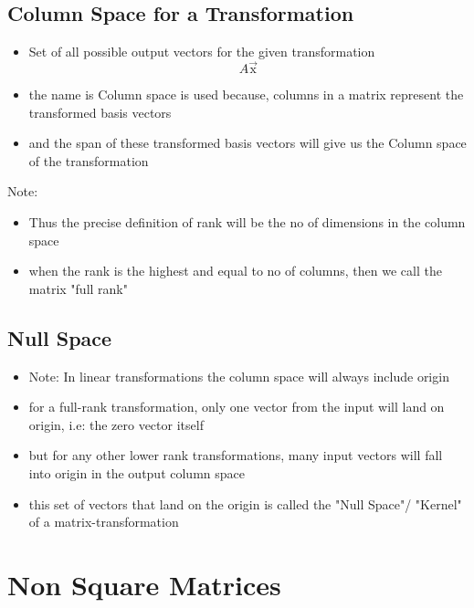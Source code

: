 \documentclass[a4paper]{article}
\begin{document}
\subsection{Column Space for a Transformation}
\begin{itemize}
	\item Set of all possible output vectors for the given transformation
	      \[
		      A \vec{\text{x}}
	      \]
	\item the name is Column space is used because,
	      columns in a matrix represent the transformed basis vectors
	\item and the span of these transformed basis vectors will give us the
	      Column space of the transformation
\end{itemize}

Note:
\begin{itemize}
	\item Thus the precise definition of rank will be the no of dimensions in
	      the column space
	\item  when the rank is the highest and equal to no of columns,
	      then we call the matrix "full rank"
\end{itemize}

\subsection{Null Space}
\begin{itemize}
	\item Note: In linear transformations the column space will always include
	      origin
	\item for a full-rank transformation, only one vector from the input
	      will land on origin, i.e: the zero vector itself
	\item but for any other lower rank transformations, many input
	      vectors will fall into origin in the output column space
	\item this set of vectors that land on the origin is called the
	      "Null Space"/ "Kernel" of a matrix-transformation
\end{itemize}

\newpage
\section{Non Square Matrices}
\end{document}
